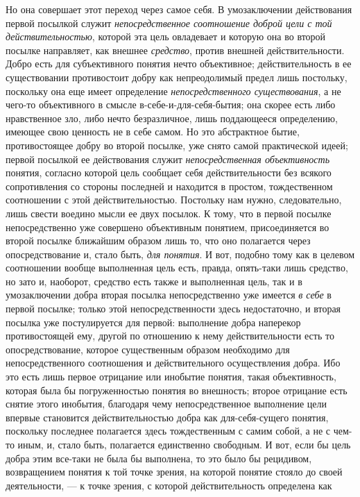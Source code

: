 \documentclass[twoside]{article}
\begin{document}
Но она совершает этот переход через самое себя. В
умозаключении действования первой посылкой служит
{\em непосредственное соотношение доброй
цели с той действительностью}, которой эта цель овладевает и
которую она во второй посылке направляет, как внешнее
{\em средство}, против
внешней действительности. Добро есть для субъективного понятия нечто
объективное; действительность в ее существовании противостоит добру как
непреодолимый предел лишь постольку, поскольку она еще имеет определение
{\em непосредственного существования},
а не чего-то объективного в смысле в-себе-и-для-себя-бытия;
она скорее есть либо нравственное зло, либо нечто безразличное, лишь
поддающееся определению, имеющее свою ценность не в себе самом. Но это
абстрактное бытие, противостоящее добру во второй посылке,
уже снято самой практической идеей; первой посылкой ее действования служит
{\em непосредственная объективность}
понятия, согласно которой цель сообщает себя действительности
без всякого сопротивления со стороны последней и находится в простом,
тождественном соотношении с этой действительностью. Постольку нам нужно,
следовательно, лишь свести воедино мысли ее двух посылок. К тому, что в
первой посылке непосредственно уже совершено объективным понятием,
присоединяется во второй посылке ближайшим образом лишь то, что оно
полагается через опосредствование и, стало быть,
{\em для понятия}. И вот,
подобно тому как в целевом соотношении вообще выполненная цель есть,
правда, опять-таки лишь средство, но зато и, наоборот, средство есть также
и выполненная цель, так и в умозаключении добра вторая посылка
непосредственно уже имеется {\em в
себе} в первой посылке; только этой непосредственности здесь
недостаточно, и вторая посылка уже постулируется для первой: выполнение
добра наперекор противостоящей ему, другой по отношению к нему
действительности есть то опосредствование, которое существенным образом
необходимо для непосредственного соотношения и действительного
осуществления добра. Ибо это есть лишь первое отрицание или инобытие
понятия, такая объективность, которая была бы погруженностью понятия во
внешность; второе отрицание есть снятие этого инобытия, благодаря чему
непосредственное выполнение цели впервые становится действительностью добра
как для-себя-сущего понятия, поскольку последнее полагается здесь
тождественным с самим собой, а не с чем-то иным, и, стало быть,
полагается единственно свободным. И вот, если бы цель добра этим все-таки
не была бы выполнена, то это было бы рецидивом, возвращением понятия к той
точке зрения, на которой понятие стояло до своей деятельности, —
к точке зрения, с которой действительность определена как
\end{document}
